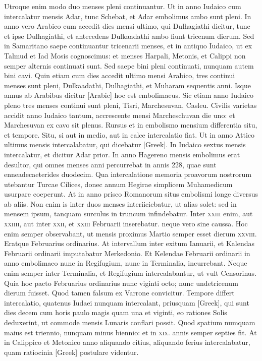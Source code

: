 Utroque enim modo duo menses pleni continuantur.
Ut in anno Iudaico cum intercalatur mensis Adar, tunc
Schebat, et Adar embolimus ambo sunt pleni.
In anno vero Arabico
cum accedit dies mensi ultimo, qui Dulhagiathi dicitur, tunc et ipse
Dulhagiathi, et antecedens Dulkaadathi ambo fiunt tricenum dierum.
Sed in Samaritano saepe continuantur tricenarii menses, et in antiquo
Iudaico, ut ex Talmud et Iad Mosis cognoscimus: et menses Harpali,
Metonis, et Calippi non semper alternis continuati sunt.
Sed saepe bini
pleni continuati, nunquam autem bini cavi.
Quin etiam cum dies accedit
ultimo mensi Arabico, tres continui menses sunt pleni, Dulkaadathi,
Dulhagiathi, et Muharam sequentis anni.
Isque annus ab Arabibus
dicitur \textarabic{[Arabic]} hoc est embolimaeus.
Sic etiam anno Iudaico pleno
tres menses continui sunt pleni, Tisri, Marchesuvan, Casleu.
Civilis
varietas accidit anno Iudaico tantum, accrescente mensi Marcheschuvan
die uno: et Marchesuvan ex cavo sit plenus.
Rursus et in embolismo
mensium differentia situ, et tempore.
Situ, si aut in medio, aut in calce
intercalatio fiat.
Ut in anno Attico ultimus mensis intercalabatur, qui
dicebatur \textgreek{[Greek]}.
In Iudaico sextus mensis intercalatur, et
dicitur Adar prior.
In anno Hagereno mensis embolimus erat desultor,
qui omnes menses anni percurrebat in annis 228, quae sunt enneadecaeterides
duodecim.
Qua intercalatione memoria proavorum nostrorum
utebantur Turcae Cilices, donec annum Hegirae simplicem
Muhamedicum usurpare coeperunt.
At in anno prisco Romanorum
situs embolismi longe diversus ab aliis.
Non enim is inter duos
menses interiiciebatur, ut alias solet: sed in mensem ipsum, tanquam
surculus in truncum infindebatur.
Inter \textsc{xxiii} enim, aut \textsc{xxiiii},
aut inter \textsc{xxii}, et \textsc{xxiii} Februarii inserebatur.
neque vero sine caussa.
Hoc enim semper observabant, ut mensis proximus Martio semper esset
dierum \textsc{xxviii}.
Eratque Februarius ordinarius.
At intervallum inter exitum
Ianuarii, et Kalendas Februarii ordinarii imputabatur Merkedonio.
Et Kelendae Februarii ordinarii in anno embolimaeo nunc in Regifugium,
nunc in Terminalia, incurrebant.
Neque enim semper inter
Terminalia, et Regifugium intercalabantur, ut vult Censorinus.
Quia hoc pacto Februarius ordinarius nunc viginti octo; nunc undetricenum
dierum fuisset.
Quod tamen falsum ex Varrone convicitur.
Tempore differt intercalatio, quatenus Iudaei nunquam intercalant,
priusquam \textgreek{[Greek]}, qui sunt dies decem cum horis paulo
magis quam una et viginti, eo rationes Solis deduxerint, ut commode
mensis Lunaris conflari possit.
Quod spatium numquam maius est
triennio, nunquam minus biennio: et in \textsc{xix}. annis semper septies fit.
At in Calippico et Metonico anno aliquando citius, aliquando ferius
intercalabatur, quam ratiocinia \textgreek{[Greek]} postulare videntur.

